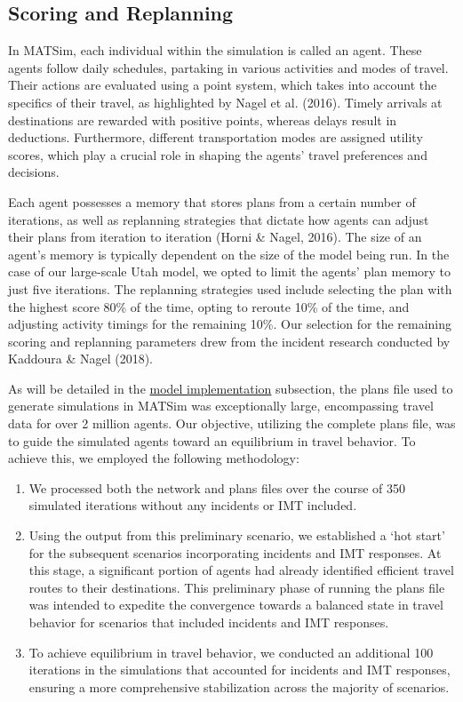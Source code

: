 \documentclass[fancy, oneside, mastersfancy, ms]{byuthesis}
\providecommand{\tightlist}{%
  \setlength{\itemsep}{0pt}\setlength{\parskip}{0pt}}\usepackage{longtable,booktabs,array}
\begin{document}
\hypertarget{sec-MATSim_Score}{%
\subsection{Scoring and Replanning}\label{sec-MATSim_Score}}

In MATSim, each individual within the simulation is called an agent.
These agents follow daily schedules, partaking in various activities and
modes of travel. Their actions are evaluated using a point system, which
takes into account the specifics of their travel, as highlighted by
Nagel et al. (2016). Timely arrivals at destinations are rewarded with
positive points, whereas delays result in deductions. Furthermore,
different transportation modes are assigned utility scores, which play a
crucial role in shaping the agents' travel preferences and decisions.

Each agent possesses a memory that stores plans from a certain number of
iterations, as well as replanning strategies that dictate how agents can
adjust their plans from iteration to iteration (Horni \& Nagel, 2016).
The size of an agent's memory is typically dependent on the size of the
model being run. In the case of our large-scale Utah model, we opted to
limit the agents' plan memory to just five iterations. The replanning
strategies used include selecting the plan with the highest score 80\%
of the time, opting to reroute 10\% of the time, and adjusting activity
timings for the remaining 10\%. Our selection for the remaining scoring
and replanning parameters drew from the incident research conducted by
Kaddoura \& Nagel (2018).

As will be detailed in the \protect\hyperlink{sec-model_imp}{model
implementation} subsection, the plans file used to generate simulations
in MATSim was exceptionally large, encompassing travel data for over 2
million agents. Our objective, utilizing the complete plans file, was to
guide the simulated agents toward an equilibrium in travel behavior. To
achieve this, we employed the following methodology:

\begin{enumerate}
\def\labelenumi{\arabic{enumi}.}
\tightlist
\item
  We processed both the network and plans files over the course of 350
  simulated iterations without any incidents or IMT included.
\item
  Using the output from this preliminary scenario, we established a `hot
  start' for the subsequent scenarios incorporating incidents and IMT
  responses. At this stage, a significant portion of agents had already
  identified efficient travel routes to their destinations. This
  preliminary phase of running the plans file was intended to expedite
  the convergence towards a balanced state in travel behavior for
  scenarios that included incidents and IMT responses.
\item
  To achieve equilibrium in travel behavior, we conducted an additional
  100 iterations in the simulations that accounted for incidents and IMT
  responses, ensuring a more comprehensive stabilization across the
  majority of scenarios.
\end{enumerate}
\end{document}
